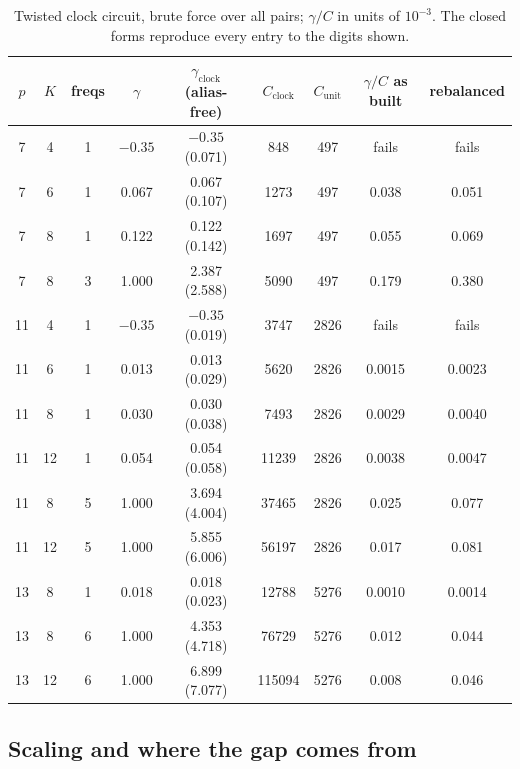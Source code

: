 \documentclass[11pt]{article}
\theoremstyle{remark}
\newcommand{\cost}{C}
\newcommand{\gam}{\gamma}
\begin{document}
\begin{table}[h]\centering
\begin{tabular}{c c c c c c c c c}
\toprule
$p$ & $K$ & freqs & $\gam$ & $\gam_{\mathrm{clock}}$ (alias-free) & $\cost_{\mathrm{clock}}$ & $\cost_{\mathrm{unit}}$ & $\gam/\cost$ as built & rebalanced \\
\midrule
7  & 4  & 1   & $-0.35$ & $-0.35$ (0.071) & 848 & 497 & fails & fails \\
7  & 6  & 1   & 0.067 & 0.067 (0.107) & 1273 & 497 & 0.038 & 0.051 \\
7  & 8  & 1   & 0.122 & 0.122 (0.142) & 1697 & 497 & 0.055 & 0.069 \\
7  & 8  & 3   & 1.000 & 2.387 (2.588) & 5090 & 497 & 0.179 & 0.380 \\
11 & 4  & 1   & $-0.35$ & $-0.35$ (0.019) & 3747 & 2826 & fails & fails \\
11 & 6  & 1   & 0.013 & 0.013 (0.029) & 5620 & 2826 & 0.0015 & 0.0023 \\
11 & 8  & 1   & 0.030 & 0.030 (0.038) & 7493 & 2826 & 0.0029 & 0.0040 \\
11 & 12 & 1   & 0.054 & 0.054 (0.058) & 11239 & 2826 & 0.0038 & 0.0047 \\
11 & 8  & 5   & 1.000 & 3.694 (4.004) & 37465 & 2826 & 0.025 & 0.077 \\
11 & 12 & 5   & 1.000 & 5.855 (6.006) & 56197 & 2826 & 0.017 & 0.081 \\
13 & 8  & 1   & 0.018 & 0.018 (0.023) & 12788 & 5276 & 0.0010 & 0.0014 \\
13 & 8  & 6   & 1.000 & 4.353 (4.718) & 76729 & 5276 & 0.012 & 0.044 \\
13 & 12 & 6   & 1.000 & 6.899 (7.077) & 115094 & 5276 & 0.008 & 0.046 \\
\bottomrule
\end{tabular}
\caption{Twisted clock circuit, brute force over all pairs; $\gam/\cost$ in units of $10^{-3}$. The closed forms reproduce every
entry to the digits shown.}
\end{table}

\subsection{Scaling and where the gap comes from}
\end{document}
